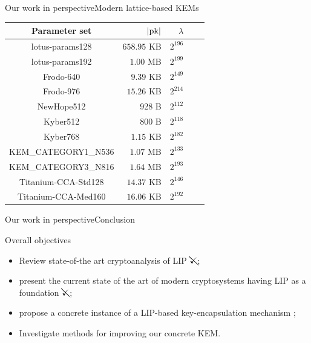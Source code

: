 \documentclass[10pt]{beamer}
\begin{document}
\begin{frame}{Our work in perspective}{Modern lattice-based KEMs}

				\begin{table}[htbp]
								\centering
								\setlength{\tabcolsep}{10pt}
								\begin{tabular}{crrrr}
												\toprule
												Parameter set & $|\text{pk}|$ & $\lambda$ \\
												\midrule \small
												lotus-params128 & $658.95$ KB & $2^{196}$ \\
												lotus-params192 & $1.00$ MB & $2^{199}$ \\
												Frodo-640 & $9.39$ KB & $2^{149}$ \\
												Frodo-976 & $15.26$ KB & $2^{214}$ \\ 
												NewHope512 & 928 B & $2^{112}$ \\
												Kyber512 & $800$ B & $2^{118}$ \\
												Kyber768 & $1.15$ KB & $2^{182}$ \\
												KEM\_CATEGORY1\_N536 & $1.07$ MB & $2^{133}$ \\
												KEM\_CATEGORY3\_N816 & $1.64$ MB & $2^{193}$ \\
												Titanium-CCA-Std128 & $14.37$ KB & $2^{146}$ \\
												Titanium-CCA-Med160 & $16.06$ KB & $2^{192}$ \\
												\bottomrule
								\end{tabular}
				\end{table}
\end{frame}

\begin{frame}{Our work in perspective}{Conclusion}

				\begin{block}{Overall objectives} \scriptsize
								\begin{itemize}
												\justifying
												\item<2-3> Review state-of-the art cryptoanalysis of LIP $\bcancel{\checkmark}$;
												\item<2-3> present the current state of the art of modern cryptosystems having LIP as a foundation $\bcancel{\checkmark}$;
												\item<1-3> propose a concrete instance of a LIP-based key-encapsulation mechanism \checkmark;
												\item<3-> Investigate methods for improving our concrete KEM.
								\end{itemize}
				\end{block}
\end{frame}
\end{document}
